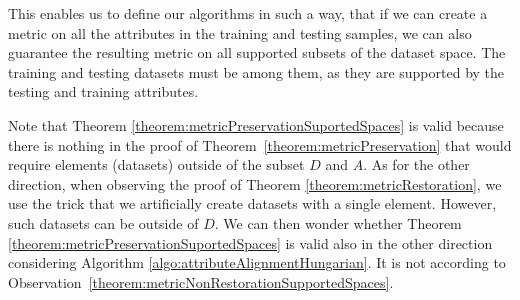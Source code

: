 This enables us to define our algorithms in such a way, that if we can create a metric on all the attributes in the training and testing samples, we can also guarantee the resulting metric on all supported subsets of the dataset space. The training and testing datasets must be among them, as they are supported by the testing and training attributes.

Note that Theorem \ref{theorem:metricPreservationSuportedSpaces} is valid because there is nothing in the proof of Theorem~\ref{theorem:metricPreservation} that would require elements (datasets) outside of the subset $D$ and $A$. As for the other direction,  when observing the proof of Theorem \ref{theorem:metricRestoration}, we use the trick that we artificially create datasets with a single element. However, such datasets can be outside of $D$. We can then wonder whether Theorem \ref{theorem:metricPreservationSuportedSpaces} is valid also in the other direction considering  Algorithm \ref{algo:attributeAlignmentHungarian}. It is not according to Observation~\ref{theorem:metricNonRestorationSupportedSpaces}.

